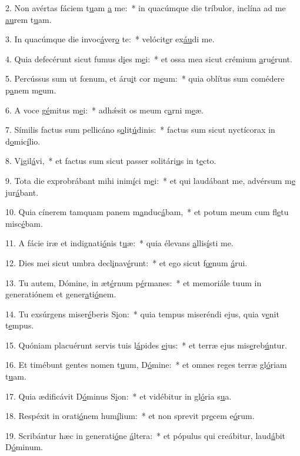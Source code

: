 2. Non avértas fáciem t\uline{u}am \uline{a} me:~* in quacúmque die tríbulor, inclína ad me \uline{au}rem t\uline{u}am.\par 
3. In quacúmque die invoc\uline{á}ver\uline{o} te:~* velócit\uline{e}r ex\uline{áu}di me.\par 
4. Quia defecérunt sicut fumus d\uline{i}es m\uline{e}i:~* et ossa mea sicut crémium \uline{a}ru\uline{é}runt.\par 
5. Percússus sum ut fœnum, et áru\uline{i}t cor m\uline{e}um:~* quia oblítus sum comédere p\uline{a}nem m\uline{e}um.\par 
6. A voce g\uline{é}mitus m\uline{e}i:~* adhǽsit os meum c\uline{a}rni m\uline{e}æ.\par 
7. Símilis factus sum pellicáno s\uline{o}lit\uline{ú}dinis:~* factus sum sicut nyctícorax in d\uline{o}mic\uline{í}lio.\par 
8. V\uline{i}gil\uline{á}vi,~* et factus sum sicut passer solitári\uline{u}s in t\uline{e}cto.\par 
9. Tota die exprobrábant mihi inim\uline{í}ci m\uline{e}i:~* et qui laudábant me, advérsum m\uline{e} jur\uline{á}bant.\par 
10. Quia cínerem tamquam panem m\uline{a}nduc\uline{á}bam,~* et potum meum cum fl\uline{e}tu misc\uline{é}bam.\par 
11. A fácie iræ et indignati\uline{ó}nis t\uline{u}æ:~* quia élevans \uline{a}llis\uline{í}sti me.\par 
12. Dies mei sicut umbra decl\uline{i}nav\uline{é}runt:~* et ego sicut f\uline{œ}num \uline{á}rui.\par 
13. Tu autem, Dómine, in æt\uline{é}rnum p\uline{é}rmanes:~* et memoriále tuum in generatiónem et gener\uline{a}ti\uline{ó}nem.\par 
14. Tu exsúrgens miser\uline{é}beris S\uline{i}on:~* quia tempus miseréndi ejus, quia v\uline{e}nit t\uline{e}mpus.\par 
15. Quóniam placuérunt servis tuis l\uline{á}pides \uline{e}jus:~* et terræ ejus mis\uline{e}reb\uline{ú}ntur.\par 
16. Et timébunt gentes nomen t\uline{u}um, D\uline{ó}mine:~* et omnes reges terræ gl\uline{ó}riam t\uline{u}am.\par 
17. Quia ædificávit D\uline{ó}minus S\uline{i}on:~* et vidébitur in gl\uline{ó}ria s\uline{u}a.\par 
18. Respéxit in orati\uline{ó}nem hum\uline{í}lium:~* et non sprevit pr\uline{e}cem e\uline{ó}rum.\par 
19. Scribántur hæc in generati\uline{ó}ne \uline{á}ltera:~* et pópulus qui creábitur, laud\uline{á}bit D\uline{ó}minum.\par 
